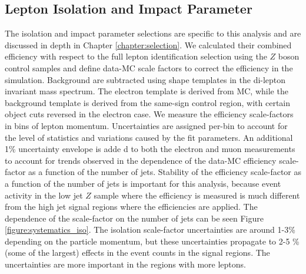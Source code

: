 \subsection{Lepton Isolation and Impact Parameter}

The isolation and impact parameter selections are specific to this analysis and are discussed in depth in Chapter \ref{chapter:selection}. We calculated their combined efficiency with respect to the full lepton identification selection using the $Z$ boson control samples and define data-MC scale factors to correct the efficiency in the simulation. Background are subtracted using shape templates in the di-lepton invariant mass spectrum. The electron template is derived from MC, while the background template is derived from the same-sign control region, with certain object cuts reversed in the electron case. We measure the efficiency scale-factors in bins of lepton momentum. Uncertainties are assigned per-bin to account for the level of statistics and variations caused by the fit parameters. An additional 1\% uncertainty envelope is adde d to both the electron and muon measurements to account for trends observed in the dependence of the data-MC efficiency scale-factor as a function of the number of jets. Stability of the efficiency scale-factor as a function of the number of jets is important for this analysis, because event activity in the low jet $Z$ sample where the efficiency is measured is much different from the high jet signal regions where the efficiencies are applied. The dependence of the scale-factor on the number of jets can be seen Figure \ref{figure:systematics_iso}. The isolation scale-factor uncertainties are around 1-3\% depending on the particle momentum, but these uncertainties propagate to 2-5 \% (some of the largest) effects in the event counts in the signal regions. The uncertainties are more important in the regions with more leptons. 


